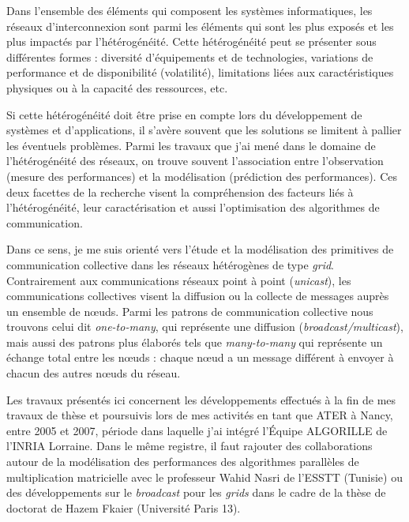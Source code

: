 \begin{resume}
Dans l'ensemble des éléments qui composent les systèmes informatiques, les réseaux d'interconnexion sont parmi les éléments qui sont les plus exposés et les plus impactés par l'hétérogénéité. Cette hétérogénéité peut se présenter sous différentes formes : diversité d'équipements et de technologies, variations de performance et de disponibilité (volatilité), limitations liées aux caractéristiques physiques ou à la capacité des ressources, etc. 

Si cette hétérogénéité doit être prise en compte lors du développement de systèmes et d'applications, il s'avère souvent que les solutions se limitent à pallier les éventuels problèmes. Parmi les travaux que j'ai mené dans le domaine de l'hétérogénéité des réseaux, on trouve souvent l'association entre l'observation (mesure des performances) et la modélisation (prédiction des performances). Ces deux facettes de la recherche visent la compréhension des facteurs liés à l'hétérogénéité, leur caractérisation et aussi l'optimisation des algorithmes de communication.

Dans ce sens, je me suis orienté vers l'étude et la modélisation des primitives de communication collective dans les réseaux hétérogènes de type \textit{grid}. Contrairement aux communications réseaux point à point (\textit{unicast}), les communications collectives visent la diffusion ou  la collecte de messages auprès un ensemble de n{\oe}uds. Parmi les patrons de communication collective nous trouvons celui dit \textit{one-to-many}, qui représente une diffusion (\textit{broadcast/multicast}), mais aussi des patrons plus élaborés tels que \textit{many-to-many} qui représente un échange total entre les n{\oe}uds : chaque n{\oe}ud a un message différent à envoyer à chacun des autres n{\oe}uds du réseau. 

Les travaux présentés ici concernent les développements effectués à la fin de mes travaux de thèse et poursuivis lors de mes activités en tant que ATER à Nancy, entre 2005 et 2007, période dans laquelle j'ai intégré l'Équipe ALGORILLE de l'INRIA Lorraine. Dans le même registre, il faut rajouter des collaborations autour de la modélisation des performances des algorithmes parallèles de multiplication matricielle avec le professeur Wahid Nasri de l'ESSTT (Tunisie) ou des développements sur le \textit{broadcast} pour les \textit{grids} dans le cadre de la thèse de doctorat de Hazem Fkaier (Université Paris 13).



\end{resume}
